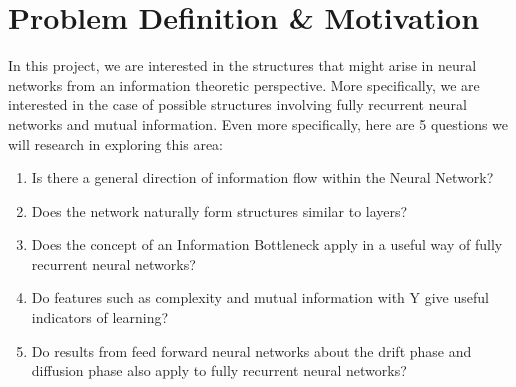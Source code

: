 \begin{titlepage}



 

\vfill %

\end{titlepage}



\section{Problem Definition \& Motivation}

In this project, we are interested in the structures that might arise in neural networks from an information theoretic perspective. More specifically, we are interested in the case of possible structures involving fully recurrent neural networks and mutual information. Even more specifically, here are 5 questions we will research in exploring this area:

\begin{enumerate}
	\item Is there a general direction of information flow within the Neural Network?
	\item Does the network naturally form structures similar to layers?
	\item Does the concept of an Information Bottleneck apply in a useful way of fully recurrent neural networks?
	\item Do features such as complexity and mutual information with Y give useful indicators of learning?
	\item Do results from feed forward neural networks about the drift phase and diffusion phase also apply to fully recurrent neural networks?
\end{enumerate}

